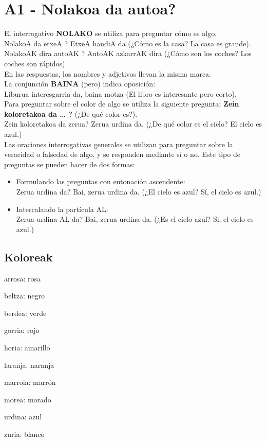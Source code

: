 \documentclass[11pt, a4paper]{article}
\begin{document}
\section{A1 - Nolakoa da autoa?}
El interrogativo \textbf{NOLAKO} se utiliza para preguntar cómo es algo.\\
\indent NolakoA da etxeA ? EtxeA handiA da (¿Cómo es la casa? La casa es grande).\\
\indent NolakoAK dira autoAK ? AutoAK azkarrAK dira (¿Cómo son los coches? Los coches son rápidos).\\
En las respuestas, los nombres y adjetivos llevan la misma marca.\\

\noindent La conjunción \textbf{BAINA} (pero) indica oposición:\\
\indent Liburua interesgarria da, baina motza (El libro es interesante pero corto).\\

\noindent Para preguntar sobre el color de algo se utiliza la siguiente pregunta: \textbf{Zein koloretakoa da … ?} (¿De qué color es?).\\
\indent  Zein koloretakoa da zerua? Zerua urdina da. (¿De qué color es el cielo? El cielo es azul.)\\

\noindent Las oraciones interrogativas generales se utilizan para preguntar sobre la veracidad o falsedad de algo, y se responden mediante sí o no. Este tipo de preguntas se pueden hacer de dos formas:
\begin{itemize}
\item Formulando las preguntas con entonación ascendente:\\
\indent  Zerua urdina da? Bai, zerua urdina da. (¿El cielo es azul? Sí, el cielo es azul.)
\item Intercalando la partícula AL:\\
\indent Zerua urdina AL da? Bai, zerua urdina da. (¿Es el cielo azul? Si, el cielo es azul.)
\end{itemize}

\subsection{Koloreak}
\begin{itemize}
\begin{multicols}{2}
\item arrosa: rosa
\item beltza: negro
\item berdea: verde
\item gorria: rojo
\item horia: amarillo
\item laranja: naranja
\item marroia: marrón
\item morea: morado
\item urdina: azul
\item zuria: blanco
\end{multicols}
\end{itemize}
\end{document}
